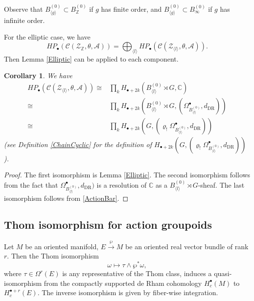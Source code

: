 \documentclass[a4paper]{amsart}
\newcommand{\DR}{\operatorname{DR}}
\newcommand{\CC}{\mathbb C}
\newcommand{\ZZ}{\mathbb Z}
\newcommand{\maA}{\mathcal A}
\newcommand{\maC}{\mathcal C}
\newcommand{\maZ}{\mathcal Z}
\newcommand\<{\langle}
\renewcommand\>{\rangle}
\newtheorem{cor}[theorem]{Corollary}
\theoremstyle{definition}
\theoremstyle{remark}
\begin{document}
Observe that $B^{(0)} _{\langle g \rangle} \subset B^{(0)} _\ZZ$ if $g$ has finite order,
and $B^{(0)} _{\langle g \rangle} \subset B^{(0)} _\infty$ if $g$ has infinite order.

For the elliptic case, we have
$$ H P _\bullet (\maC (\maZ _\ZZ , \theta , \maA))
= \bigoplus _{\langle l \rangle} H P _\bullet (\maC (\maZ _{\langle l \rangle} , \theta , \maA)) .$$
Then Lemma \ref{Elliptic} can be applied to each component.
\begin{cor}
\label{HPSplitting}
We have
\begin{align*}
H P _\bullet (\maC (\maZ _{\langle l \rangle} , \theta , \maA))
\cong & \prod _k H _{\bullet + 2 k} (B^{(0)}_{\langle l \rangle} \rtimes G , \CC) \\
\cong & \prod _k H _{\bullet + 2 k}
(B^{(0)}_{\langle l \rangle} \rtimes G , (\Omega _{B^{(0)}_{\langle l \rangle}}^\bullet, d _{\DR}))\\
\cong & \prod _k H _{\bullet + 2 k} (G , (\varrho _! \Omega _{B^{(0)} _{\langle l \rangle}} ^\bullet , d _{\DR}))
\end{align*}
(see Definition \ref{ChainCyclic} for the definition of
$H _{\bullet + 2 k} (G , (\varrho _! \Omega _{B^{(0)} _{\langle l \rangle}} ^\bullet , d _{\DR}))$).
\end{cor}
\begin{proof}
The first isomorphism is Lemma \ref{Elliptic}.
The second isomorphism follows from the fact that
$\Omega _{B^{(0)} _{\langle l \rangle}} ^\bullet , d _{\DR})$ is a resolution of
$\CC$ as a $B^{(0)} _{\langle l \rangle} \rtimes G$-sheaf.
The last isomorphism follows from \eqref{ActionBar}.
\end{proof}

\subsection{Thom isomorphism for action groupoids}
Let $M$ be an oriented manifold, $E \xrightarrow{\wp} M$ be an oriented real vector bundle of rank $r$.
Then the Thom isomorphism
$$ \omega \mapsto \tau \wedge \wp ^* \omega , $$
where $\tau \in \Omega ^r (E)$ is any representative of the Thom class,
induces a quasi-isomorphism from the compactly supported de Rham cohomology $H ^\bullet _c ( M ) $ to $H ^{\bullet + r} _c ( E )$.
The inverse isomorphism is given by fiber-wise integration.
\end{document}
